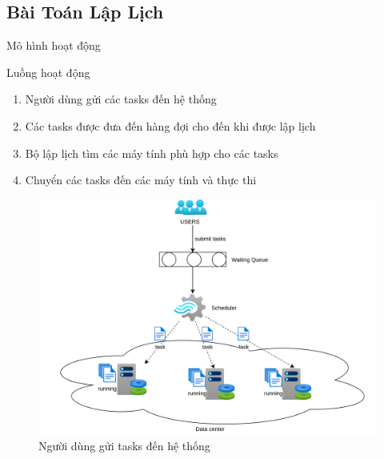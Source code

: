 \documentclass[11pt,xcolor={dvipsnames}, aspectratio=169]{beamer}
\begin{document}
\subsection{Bài Toán Lập Lịch}

\begin{frame}
{Mô hình hoạt động}
\begin{minipage}[t]{0.48\linewidth}
	\begin{block}
	{Luồng hoạt động}
	\begin{enumerate}
		\item Người dùng gửi các tasks đến hệ thống
		\item Các tasks được đưa đến hàng đợi cho đến khi được lập lịch
		\item Bộ lập lịch tìm các máy tính phù hợp cho các tasks
		\item Chuyển các tasks đến các máy tính và thực thi
	\end{enumerate}
	\end{block}
\end{minipage}
\hfill
\begin{minipage}[t]{0.48\linewidth}
	\begin{figure}
		\centering
		\includegraphics[scale=0.4]{images/basic_flow.png}
		\caption{Người dùng gửi tasks đến hệ thống}
	\end{figure}
\end{minipage}
\end{frame}
\end{document}

